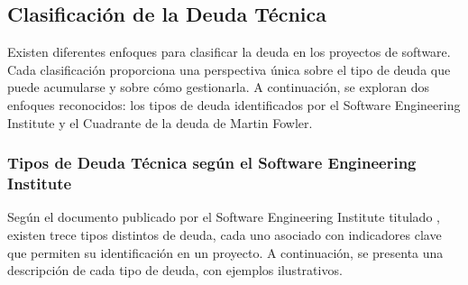 \subsection{Clasificación de la Deuda Técnica}

Existen diferentes enfoques para clasificar la \gls{deuda} en los proyectos de software. Cada clasificación proporciona una perspectiva única sobre el tipo de deuda que puede acumularse y sobre cómo gestionarla. A continuación, se exploran dos enfoques reconocidos: los tipos de \Gls{deuda} identificados por el Software Engineering Institute y el Cuadrante de la \Gls{deuda} de Martin Fowler.

\subsubsection{Tipos de Deuda Técnica según el Software Engineering Institute}
Según el documento publicado por el Software Engineering Institute titulado , existen trece tipos distintos de \gls{deuda}, cada uno asociado con indicadores clave que permiten su identificación en un proyecto. A continuación, se presenta una descripción de cada tipo de \gls{deuda}, con ejemplos ilustrativos.
